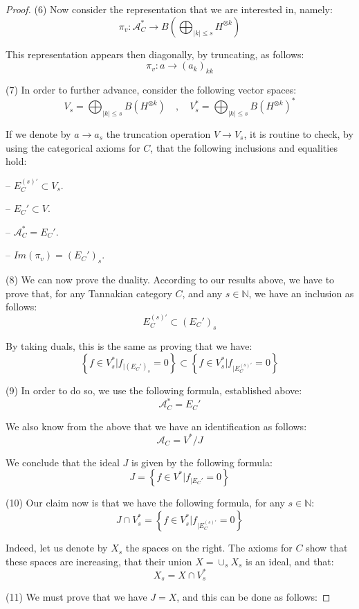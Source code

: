\documentclass[12pt]{amsbook}
\begin{document}
\begin{proof}
(6) Now consider the representation that we are interested in, namely:
$$\pi_v:\mathcal A_C^*\to B\left(\bigoplus_{|k|\leq s}H^{\otimes k}\right)$$

This representation appears then diagonally, by truncating, as follows:
$$\pi_v:a\to (a_k)_{kk}$$

(7) In order to further advance, consider the following vector spaces:
$$V_s=\bigoplus_{|k|\leq s}B\left(H^{\otimes k}\right)\quad,\quad 
V^*_s=\bigoplus_{|k|\leq s}B\left(H^{\otimes k}\right)^*$$

If we denote by $a\to a_s$ the truncation operation $V\to V_s$, it is routine to check, by using the categorical axioms for $C$, that the following inclusions and equalities hold:

\medskip

-- $E_C^{(s)'}\subset V_s$.

\medskip

-- $E_C'\subset V$.

\medskip

-- $\mathcal A_C^*=E_C'$.

\medskip

-- $Im(\pi_v)=(E_C')_s$.

\medskip

(8) We can now prove the duality. According to our results above, we have to prove that, for any Tannakian category $C$, and any $s\in\mathbb N$, we have an inclusion as follows:
$$E_C^{(s)'}\subset(E_C')_s$$

By taking duals, this is the same as proving that we have:
$$\left\{f\in V_s^*\Big|f_{|(E_C')_s}=0\right\}\subset\left\{f\in V_s^*\Big|f_{|E_C^{(s)'}}=0\right\}$$

(9) In order to do so, we use the following formula, established above: 
$$\mathcal A_C^*=E_C'$$

We also know from the above that we have an identification as follows:
$$\mathcal A_C=V^*/J$$

We conclude that the ideal $J$ is given by the following formula:
$$J=\left\{f\in V^*\Big|f_{|E_C'}=0\right\}$$

(10) Our claim now is that we have the following formula, for any $s\in\mathbb N$:
$$J\cap V_s^*=\left\{f\in V_s^*\Big|f_{|E_C^{(s)'}}=0\right\}$$

Indeed, let us denote by $X_s$ the spaces on the right. The axioms for $C$ show that these spaces are increasing, that their union $X=\cup_sX_s$ is an ideal, and that:
$$X_s=X\cap V_s^*$$

(11) We must prove that we have $J=X$, and this can be done as follows:


\end{proof}
\end{document}
